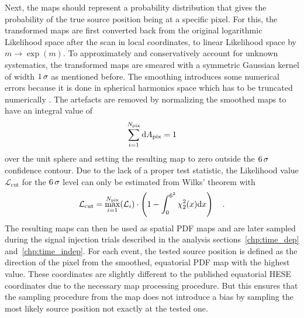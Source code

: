Next, the maps should represent a probability distribution that gives the probability of the true source position being at a specific pixel.
For this, the transformed maps are first converted back from the original logarithmic Likelihood space after the scan in local coordinates, to linear Likelihood space by $m\rightarrow \exp{(m)}$.
To approximately and conservatively account for unknown systematics, the transformed maps are smeared with a symmetric Gaussian kernel of width $\num{1}\,\sigma$ as mentioned before.
The smoothing introduces some numerical errors because it is done in spherical harmonics space which has to be truncated numerically \cite{Gorski:2004by}.
The artefacts are removed by normalizing the smoothed maps to have an integral value of
\begin{equation}
  \sum_{i=1}^{N_\text{pix}} \mathrm{d}A_\text{pix} = 1
\end{equation}
over the unit sphere and setting the resulting map to zero outside the $\num{6}\,\sigma$ confidence contour.
Due to the lack of a proper test statistic, the Likelihood value $\mathcal{L}_\text{cut}$ for the $\num{6}\,\sigma$ level can only be estimated from Wilks' theorem with
\begin{equation}
  \mathcal{L}_\text{cut} =
    \max_{i=1}^{N_\text{pix}}(\mathcal{L}_i)\cdot
    \left(1 - \int_0^{6^2}\chi^2_{2}(x)\mathrm{d}x\right)
  \quad\text{.}
\end{equation}
The resulting maps can then be used as spatial PDF maps and are later sampled during the signal injection trials described in the analysis sections~\ref{chp:time_dep} and~\ref{chp:time_indep}.
For each event, the tested source position is defined as the direction of the pixel from the smoothed, equatorial PDF map with the highest value.
These coordinates are slightly different to the published equatorial HESE coordinates due to the necessary map processing procedure.
But this ensures that the sampling procedure from the map does not introduce a bias by sampling the most likely source position not exactly at the tested one.

